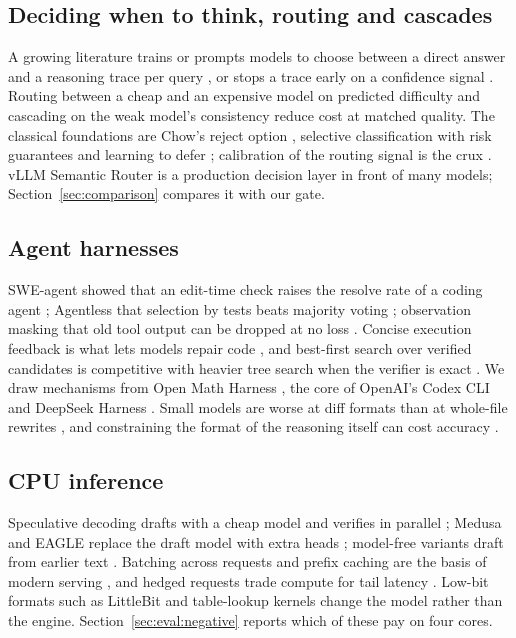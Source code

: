 \subsection{Deciding when to think, routing and cascades}
A growing literature trains or prompts models to choose between a direct answer
and a reasoning trace per query
\cite{zhang2025adaptthink,fang2025thinkless,he2025selfroute,hou2025thinkprune,yang2025deer,arora2025efficient},
or stops a trace early on a confidence signal
\cite{aggarwal2023adaptive,li2024esc,fu2025deepconf}. Routing between a cheap
and an expensive model on predicted difficulty
\cite{ding2024hybridllm,ong2025routellm} and cascading on the weak model's
consistency \cite{yue2024cascades,chen2023frugalgpt} reduce cost at matched
quality. The classical foundations are Chow's reject option
\cite{chow1970reject}, selective classification with risk guarantees
\cite{geifman2017selective} and learning to defer
\cite{madras2018defer,mozannar2020defer}; calibration of the routing signal is
the crux \cite{guo2017calibration,kadavath2022know,tian2023calibration}. vLLM
Semantic Router \cite{semanticrouter2026} is a production decision layer in
front of many models; Section~\ref{sec:comparison} compares it with our gate.

\subsection{Agent harnesses}
SWE-agent showed that an edit-time check raises the resolve rate of a coding
agent \cite{yang2024sweagent}; Agentless that selection by tests beats majority
voting \cite{xia2024agentless}; observation masking that old tool output can be
dropped at no loss \cite{lindenbauer2025complexity}. Concise execution feedback
is what lets models repair code \cite{chen2024selfdebug}, and best-first search
over verified candidates is competitive with heavier tree search when the
verifier is exact \cite{xin2025bfsprover}. We draw mechanisms from Open Math
Harness \cite{openmathharness2026}, the core of OpenAI's Codex CLI
\cite{openaicodex2026} and DeepSeek Harness \cite{deepseekharness2026}. Small
models are worse at diff formats than at whole-file rewrites
\cite{diffxyz2025,aider2024editformats}, and constraining the format of the
reasoning itself can cost accuracy \cite{tam2024speakfreely}.

\subsection{CPU inference}
Speculative decoding drafts with a cheap model and verifies in parallel
\cite{leviathan2023speculative,chen2023speculative}; Medusa and EAGLE replace
the draft model with extra heads \cite{cai2024medusa,li2024eagle}; model-free
variants draft from earlier text \cite{oliaro2024suffix}. Batching across
requests and prefix caching are the basis of modern serving
\cite{yu2022orca,kwon2023pagedattention,zheng2024sglang}, and hedged requests
trade compute for tail latency \cite{dean2013tail}. Low-bit formats such as
LittleBit \cite{littlebit2025} and table-lookup kernels \cite{wei2024tmac}
change the model rather than the engine. Section~\ref{sec:eval:negative}
reports which of these pay on four cores.

